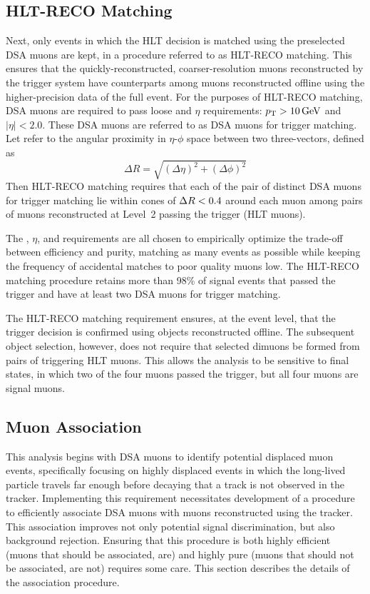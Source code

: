\subsection{HLT-RECO Matching}
\label{sec:dd:HLTMatching}
Next, only events in which the HLT decision is matched using the preselected DSA muons are kept, in a procedure referred to as HLT-RECO matching.
This ensures that the quickly-reconstructed, coarser-resolution muons reconstructed by the trigger system have counterparts among muons reconstructed offline using the higher-precision data of the full event.
For the purposes of HLT-RECO matching, DSA muons are required to pass loose \pT and $\eta$ requirements: $p_{\mathrm{T}} > 10\,\text{Ge\hspace{-.08em}V}$ and $|\eta| < 2.0$.
These DSA muons are referred to as DSA muons for trigger matching.
Let \deltaR refer to the angular proximity in $\eta$-$\phi$ space between two three-vectors, defined as
\begin{equation}
  \Delta R = \sqrt{\left(\Delta\eta\right)^2 + \left(\Delta\phi\right)^2}
  \label{eq:dd:deltaR}
\end{equation}
Then HLT-RECO matching requires that each of the pair of distinct DSA muons for trigger matching lie within cones of $\Delta R < 0.4$ around each muon among pairs of muons reconstructed at Level~2 passing the trigger (HLT muons).

The \pT, $\eta$, and \deltaR requirements are all chosen to empirically optimize the trade-off between efficiency and purity, matching as many events as possible while keeping the frequency of accidental matches to poor quality muons low.
The HLT-RECO matching procedure retains more than 98\% of \twoMu signal events that passed the trigger and have at least two DSA muons for trigger matching.

The HLT-RECO matching requirement ensures, at the event level, that the trigger decision is confirmed using objects reconstructed offline.
The subsequent object selection, however, does not require that selected dimuons be formed from pairs of triggering HLT muons.
This allows the analysis to be sensitive to \fourMu final states, in which two of the four muons passed the trigger, but all four muons are signal muons.

\subsection{\DSAToPAT Muon Association}
\label{sec:dd:Association}
This analysis begins with DSA muons to identify potential displaced muon events, specifically focusing on highly displaced events in which the long-lived particle travels far enough before decaying that a track is not observed in the tracker.
Implementing this requirement necessitates development of a procedure to efficiently associate DSA muons with muons reconstructed using the tracker.
This association improves not only potential signal discrimination, but also background rejection.
Ensuring that this procedure is both highly efficient (\ie muons that should be associated, are) and highly pure (\ie muons that should not be associated, are not) requires some care.
This section describes the details of the association procedure.


